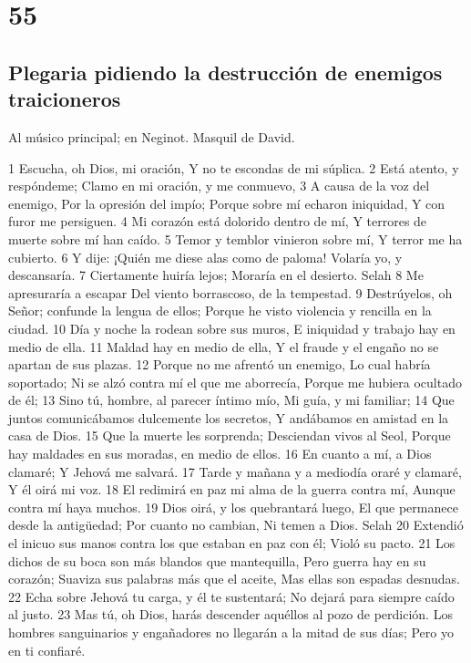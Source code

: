 \chapter{55}

\section*{Plegaria pidiendo la destrucción de enemigos traicioneros}

Al músico principal; en Neginot. Masquil de David.

1 Escucha, oh Dios, mi oración,
Y no te escondas de mi súplica.
2 Está atento, y respóndeme;
Clamo en mi oración, y me conmuevo,
3 A causa de la voz del enemigo,
Por la opresión del impío;
Porque sobre mí echaron iniquidad,
Y con furor me persiguen.
4 Mi corazón está dolorido dentro de mí,
Y terrores de muerte sobre mí han caído.
5 Temor y temblor vinieron sobre mí,
Y terror me ha cubierto.
6 Y dije: ¡Quién me diese alas como de paloma!
Volaría yo, y descansaría.
7 Ciertamente huiría lejos;
Moraría en el desierto. Selah
8 Me apresuraría a escapar
Del viento borrascoso, de la tempestad.
9 Destrúyelos, oh Señor; confunde la lengua de ellos;
Porque he visto violencia y rencilla en la ciudad.
10 Día y noche la rodean sobre sus muros,
E iniquidad y trabajo hay en medio de ella.
11 Maldad hay en medio de ella,
Y el fraude y el engaño no se apartan de sus plazas.
12 Porque no me afrentó un enemigo,
Lo cual habría soportado;
Ni se alzó contra mí el que me aborrecía,
Porque me hubiera ocultado de él;
13 Sino tú, hombre, al parecer íntimo mío,
Mi guía, y mi familiar;
14 Que juntos comunicábamos dulcemente los secretos,
Y andábamos en amistad en la casa de Dios.
15 Que la muerte les sorprenda;
Desciendan vivos al Seol,
Porque hay maldades en sus moradas, en medio de ellos.
16 En cuanto a mí, a Dios clamaré;
Y Jehová me salvará.
17 Tarde y mañana y a mediodía oraré y clamaré,
Y él oirá mi voz.
18 El redimirá en paz mi alma de la guerra contra mí,
Aunque contra mí haya muchos.
19 Dios oirá, y los quebrantará luego,
El que permanece desde la antigüedad;
Por cuanto no cambian,
Ni temen a Dios. Selah
20 Extendió el inicuo sus manos contra los que estaban en paz con él;
Violó su pacto.
21 Los dichos de su boca son más blandos que mantequilla,
Pero guerra hay en su corazón;
Suaviza sus palabras más que el aceite,
Mas ellas son espadas desnudas.
22 Echa sobre Jehová tu carga, y él te sustentará;
No dejará para siempre caído al justo.
23 Mas tú, oh Dios, harás descender aquéllos al pozo de perdición.
Los hombres sanguinarios y engañadores no llegarán a la mitad de sus días;
Pero yo en ti confiaré.

